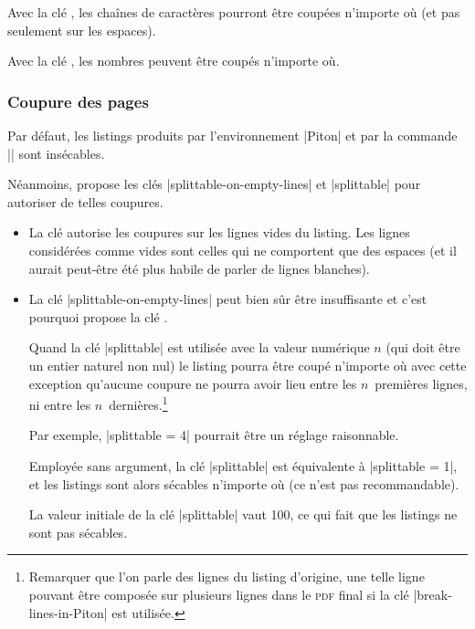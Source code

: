 \documentclass[dvipsnames,svgnames]{article}
\begin{document}
\bigskip
Avec la clé , les chaînes de caractères pourront être
coupées n'importe où (et pas seulement sur les espaces). 


\bigskip
Avec la clé , les nombres peuvent être coupés n'importe où.


\subsubsection{Coupure des pages}

\label{coupure-de-pages}


Par défaut, les listings produits par l'environnement |{Piton}| et par la commande
|\PitonInputFile| sont insécables.


Néanmoins,  propose les clés |splittable-on-empty-lines| et |splittable| pour
autoriser de telles coupures.

\begin{itemize}
\item La clé  autorise les coupures sur les lignes
vides du listing. Les lignes considérées comme vides sont celles qui ne comportent que des
espaces (et il aurait peut-être été plus habile de parler de lignes blanches). 

\medskip
\item La clé |splittable-on-empty-lines| peut bien sûr être insuffisante et c'est pourquoi
 propose la clé .

Quand la clé |splittable| est utilisée avec la valeur numérique $n$ (qui doit être un
entier naturel non nul) le listing pourra être coupé n'importe où avec cette exception
qu'aucune coupure ne pourra avoir lieu entre les $n$~premières lignes, ni entre les
$n$~dernières.\footnote{Remarquer que l'on parle des lignes du listing d'origine, une
  telle ligne pouvant être composée sur plusieurs lignes dans le \textsc{pdf} final si la
  clé |break-lines-in-Piton| est utilisée.}

Par exemple, |splittable = 4| pourrait être un réglage raisonnable.

Employée sans argument, la clé |splittable| est équivalente à |splittable = 1|, et les
listings sont alors sécables n'importe où (ce n'est pas recommandable).

La valeur initiale de la clé |splittable| vaut 100, ce qui fait que les listings ne sont
pas sécables. 
\end{itemize}
\end{document}
